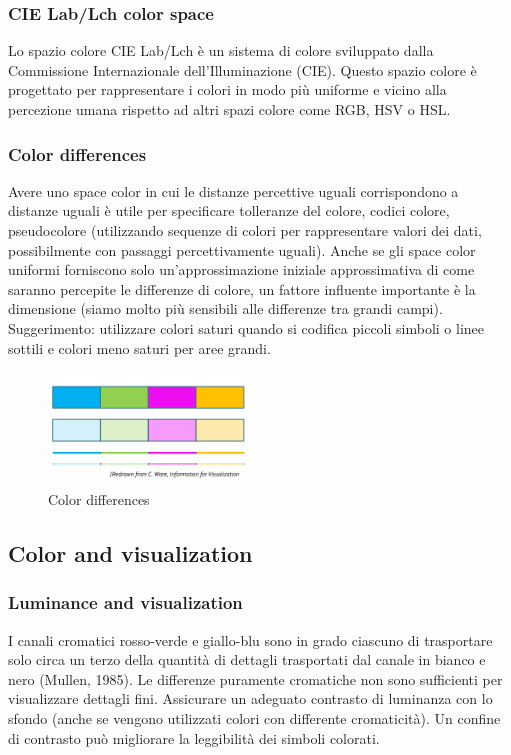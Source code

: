 \subsubsection{CIE Lab/Lch color space}
Lo spazio colore CIE Lab/Lch è un sistema di colore sviluppato dalla Commissione Internazionale dell'Illuminazione (CIE). Questo spazio colore è progettato per rappresentare i colori in modo più uniforme e vicino alla percezione umana rispetto ad altri spazi 
colore come RGB, HSV o HSL.
\subsubsection{Color differences}
Avere uno space color in cui le distanze percettive uguali corrispondono a distanze uguali è utile per specificare tolleranze del colore, codici colore, pseudocolore (utilizzando sequenze di colori per rappresentare valori dei dati, possibilmente con passaggi percettivamente uguali).
Anche se gli space color uniformi forniscono solo un'approssimazione iniziale approssimativa di come saranno percepite le differenze di colore, un fattore influente importante è la dimensione (siamo molto più sensibili alle differenze tra grandi campi).
Suggerimento: utilizzare colori saturi quando si codifica piccoli simboli o linee sottili e colori meno saturi per aree grandi.
\begin{figure}[H]
    \centering
    \includegraphics[width=0.5\textwidth]{images/ColorDifferences.png} 
    \caption{Color differences}
    \label{fig:immagine}
\end{figure}
\subsection{Color and visualization}
\subsubsection{Luminance and visualization}
I canali cromatici rosso-verde e giallo-blu sono in grado ciascuno di trasportare 
solo circa un terzo della quantità di dettagli trasportati dal canale in bianco e nero (Mullen, 1985). 
Le differenze puramente cromatiche non sono sufficienti per visualizzare dettagli fini. Assicurare un adeguato contrasto di luminanza con lo sfondo (anche se vengono utilizzati colori con differente cromaticità).
Un confine di contrasto può migliorare la leggibilità dei simboli colorati.
